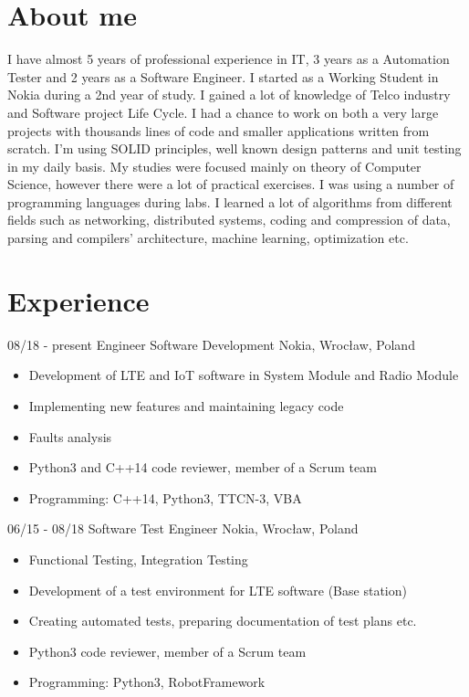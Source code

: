 \documentclass[tikz]{friggeri-cv}
\begin{document}
\section{About me}
\small
{
I have almost 5 years of professional experience in IT, 3 years as a Automation Tester and 2 years as a Software Engineer.
I started as a Working Student in Nokia during a 2nd year of study. I gained a lot of knowledge of Telco industry and
Software project Life Cycle. I had a chance to work on both a very large projects with thousands lines of code
and smaller applications written from scratch. I'm using SOLID principles, well known design patterns and unit testing in my daily basis.
My studies were focused mainly on theory of Computer Science, however there were a lot of practical exercises. I was using a number of
programming languages during labs. I learned a lot of algorithms from different fields such as networking, distributed systems,
coding and compression of data, parsing and compilers' architecture, machine learning, optimization etc.
}

\section{Experience}
\begin{entrylist}
  \entry
    {08/18 - present}
    {Engineer Software Development}
    {Nokia, Wrocław, Poland}
    {
      \vspace{-3mm}
      \begin{itemize}
        \setlength\itemsep{0.2em}
        \item Development of LTE and IoT software in System Module and Radio Module
        \item Implementing new features and maintaining legacy code
        \item Faults analysis
        \item Python3 and C++14 code reviewer, member of a Scrum team
        \item Programming: C++14, Python3, TTCN-3, VBA
      \end{itemize}
    }
  \entry
    {06/15 - 08/18}
    {Software Test Engineer}
    {Nokia, Wrocław, Poland}
    {
      \vspace{-3mm}
      \begin{itemize}
        \setlength\itemsep{0.2em}
        \item Functional Testing, Integration Testing
        \item Development of a test environment for LTE software (Base station)
        \item Creating automated tests, preparing documentation of test plans etc.
        \item Python3 code reviewer, member of a Scrum team
        \item Programming: Python3, RobotFramework
      \end{itemize}
    }
\end{entrylist}
\end{document}

